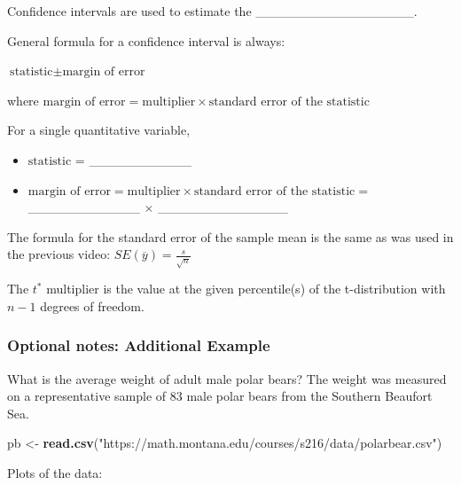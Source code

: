 \documentclass[
]{report}
\newenvironment{Shaded}{\begin{snugshade}}{\end{snugshade}}
\newcommand{\FunctionTok}[1]{\textcolor[rgb]{0.13,0.29,0.53}{\textbf{#1}}}
\newcommand{\NormalTok}[1]{#1}
\newcommand{\OtherTok}[1]{\textcolor[rgb]{0.56,0.35,0.01}{#1}}
\newcommand{\StringTok}[1]{\textcolor[rgb]{0.31,0.60,0.02}{#1}}
\newcommand{\rgi}{\hspace{24pt}}  %
\begin{document}
Confidence intervals are used to estimate the \_\_\_\_\_\_\_\_\_\_\_\_\_\_\_\_\_.

General formula for a confidence interval is always:

\rgi \rgi \(\text{statistic} \pm \text{margin of error}\)

\rgi \rgi where \(\text{margin of error} = \text{multiplier} \times \text{standard error of the statistic}\)

For a single quantitative variable,

\begin{itemize}
\item
  \(\text{statistic}\) = \_\_\_\_\_\_\_\_\_\_\_
\item
  \(\text{margin of error} = \text{multiplier} \times \text{standard error of the statistic}=\) \_\_\_\_\_\_\_\_\_\_\_\_ \(\times\) \_\_\_\_\_\_\_\_\_\_\_\_\_\_
\end{itemize}

The formula for the standard error of the sample mean is the same as was used in the previous video: \(SE(\overline{y}) = \frac{s}{\sqrt{n}}\)

The \(t^*\) multiplier is the value at the given percentile(s) of the t-distribution with \(n - 1\) degrees of freedom.


\subsubsection*{Optional notes: Additional Example}\label{optional-notes-additional-example-7}

What is the average weight of adult male polar bears? The weight was measured on a representative sample of 83 male polar bears from the Southern Beaufort Sea.

\begin{Shaded}
\begin{Highlighting}[]
\NormalTok{pb }\OtherTok{\textless{}{-}} \FunctionTok{read.csv}\NormalTok{(}\StringTok{"https://math.montana.edu/courses/s216/data/polarbear.csv"}\NormalTok{)}
\end{Highlighting}
\end{Shaded}

Plots of the data:
\end{document}
